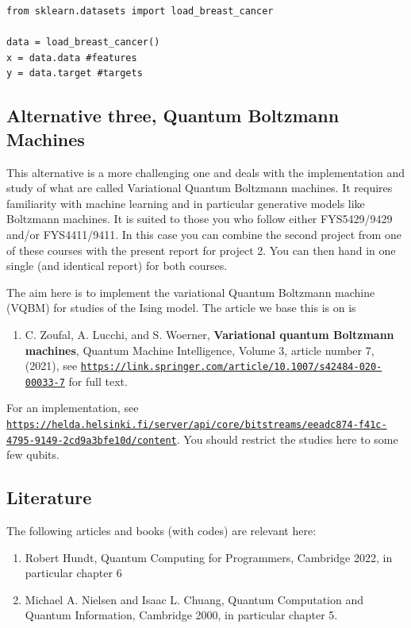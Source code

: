 \documentclass[%
oneside,                 %
final,                   %
10pt]{article}
\begin{document}
\begin{verbatim}
from sklearn.datasets import load_breast_cancer

data = load_breast_cancer()
x = data.data #features
y = data.target #targets

\end{verbatim}


\subsection*{Alternative three, Quantum Boltzmann Machines}

This alternative is a more challenging one and deals with the
implementation and study of what are called Variational Quantum
Boltzmann machines.  It requires familiarity with machine learning and
in particular generative models like Boltzmann machines. It is suited
to those you who follow either FYS5429/9429 and/or FYS4411/9411. In
this case you can combine the second project from one of these courses
with the present report for project 2. You can then hand in one single
(and identical report) for both courses.

The aim here is to implement the variational Quantum Boltzmann machine (VQBM) for studies of the Ising model.
The article we base this is on is
\begin{enumerate}
\item C. Zoufal, A. Lucchi, and S. Woerner, \textbf{Variational quantum Boltzmann machines}, Quantum Machine Intelligence, Volume 3, article number 7, (2021), see \href{{https://link.springer.com/article/10.1007/s42484-020-00033-7}}{\nolinkurl{https://link.springer.com/article/10.1007/s42484-020-00033-7}} for full text.
\end{enumerate}

\noindent
For an implementation, see \href{{https://helda.helsinki.fi/server/api/core/bitstreams/eeadc874-f41c-4795-9149-2cd9a3bfe10d/content}}{\nolinkurl{https://helda.helsinki.fi/server/api/core/bitstreams/eeadc874-f41c-4795-9149-2cd9a3bfe10d/content}}. You should restrict the studies here to some few qubits.  

\subsection*{Literature}

The following articles and books (with codes) are relevant here:
\begin{enumerate}
\item Robert Hundt, Quantum Computing for Programmers, Cambridge 2022, in particular chapter 6

\item Michael A. Nielsen and Isaac L. Chuang, Quantum Computation and Quantum Information, Cambridge 2000, in particular chapter 5.
\end{enumerate}
\end{document}
